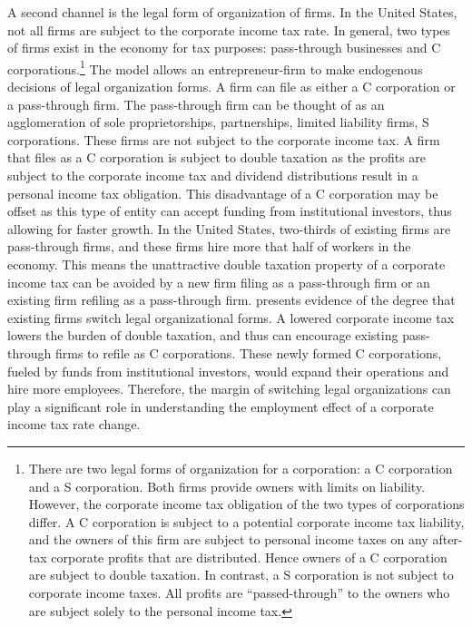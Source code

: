 \documentclass[12pt]{article}
\begin{document}
A second channel is the legal form of organization of firms. In the United States, not all firms are subject to the corporate income tax rate. In
general, two types of firms exist in the economy for tax purposes: pass-through businesses and C corporations.\footnote{There are two legal forms of organization for a corporation: a C corporation and a S corporation. Both firms provide owners with limits on liability.
However, the corporate income tax obligation of the two types of corporations differ. A C corporation is subject to a potential corporate
income tax liability, and the owners of this firm are subject to personal income taxes on any after-tax corporate profits that are distributed. Hence owners of a C corporation are subject to double taxation. In contrast, a S corporation is not subject to corporate income taxes. All profits are ``passed-through'' to the owners who are subject solely to the personal income tax.} The model allows an entrepreneur-firm to make endogenous decisions of legal organization forms. A firm can file as either a C corporation or a pass-through firm. The pass-through firm can be thought of as an agglomeration of sole proprietorships, partnerships, limited liability firms, S corporations. These firms are not subject to the
corporate income tax. A firm that files as a C corporation is subject to double taxation as the profits are subject to the corporate income tax and dividend distributions result in a personal income tax obligation. This disadvantage of a C corporation may be offset as this type of entity can accept funding from institutional investors, thus allowing for faster growth. In the United States, two-thirds of existing firms are pass-through firms, and these firms hire more that half of workers in the economy. This means the unattractive double taxation property of a corporate income tax can be avoided by a new firm filing as a pass-through firm or an existing firm refiling as a pass-through firm. \citet{Goolsbee2004} presents evidence of the degree that existing firms switch legal organizational forms. A lowered corporate income tax lowers the burden of double taxation, and thus can encourage existing pass-through firms to refile as C corporations. These newly formed C corporations, fueled by funds from institutional investors, would expand their operations and hire more employees. Therefore, the margin of switching legal organizations can play a significant role in understanding the employment effect of a corporate income tax rate change.
\end{document}

